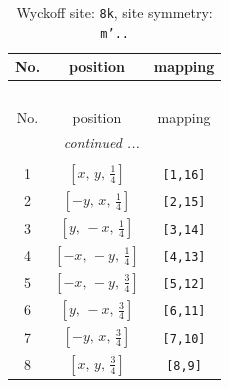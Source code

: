 \documentclass[fleqn,8pt]{jsarticle}
\begin{document}
\begin{longtable}{ccc}
\caption{Wyckoff site: {\tt 8k}, site symmetry: {\tt m'..}}
 \\
 \hline \hline
No. & position & mapping \\ \hline \endfirsthead

\multicolumn{2}{l}{\tablename\ \thetable{}} \\
 \hline \hline
No. & position & mapping \\ \hline \endhead

 \hline \hline
\multicolumn{2}{r}{\footnotesize\it continued ...} \\ \endfoot

 \hline \hline
\multicolumn{2}{r}{} \\ \endlastfoot

1 & $\left[ x,\, y,\, \frac{1}{4} \right]$ & {\tt [1,16]} \\ \hline
2 & $\left[ - y,\, x,\, \frac{1}{4} \right]$ & {\tt [2,15]} \\ \hline
3 & $\left[ y,\, - x,\, \frac{1}{4} \right]$ & {\tt [3,14]} \\ \hline
4 & $\left[ - x,\, - y,\, \frac{1}{4} \right]$ & {\tt [4,13]} \\ \hline
5 & $\left[ - x,\, - y,\, \frac{3}{4} \right]$ & {\tt [5,12]} \\ \hline
6 & $\left[ y,\, - x,\, \frac{3}{4} \right]$ & {\tt [6,11]} \\ \hline
7 & $\left[ - y,\, x,\, \frac{3}{4} \right]$ & {\tt [7,10]} \\ \hline
8 & $\left[ x,\, y,\, \frac{3}{4} \right]$ & {\tt [8,9]} \\
\end{longtable}
\renewcommand{\arraystretch}{1.2}
\end{document}
